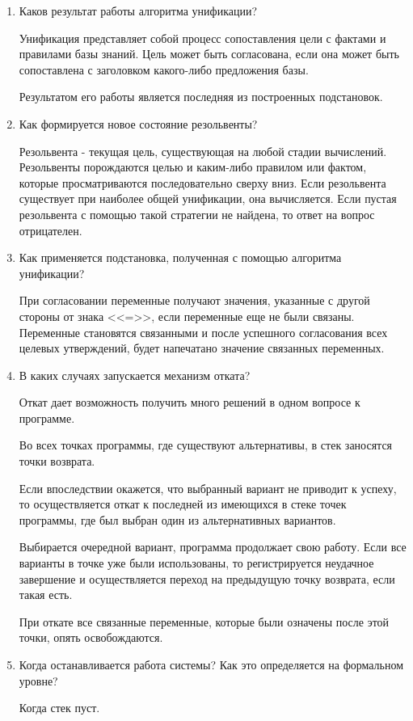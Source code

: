 \documentclass[a4paper,14pt]{extreport} %
\begin{document}
\begin{enumerate}
\item Каков результат работы алгоритма унификации?

Унификация представляет собой процесс сопоставления цели с фактами и правилами базы знаний. Цель может быть согласована, если она может быть сопоставлена с заголовком какого-либо предложения базы.

Результатом его работы является последняя из построенных подстановок. 

\item Как формируется новое состояние резольвенты?

Резольвента - текущая цель, существующая на любой стадии вычислений. Резольвенты порождаются целью и каким-либо правилом или фактом, которые просматриваются последовательно сверху вниз. Если резольвента существует при наиболее общей унификации, она вычисляется. Если пустая резольвента с помощью такой стратегии не найдена, то ответ на вопрос отрицателен.

\item Как применяется подстановка, полученная с помощью алгоритма унификации?

При согласовании переменные получают значения, указанные с другой стороны от знака <<=>>, если переменные еще не были связаны. Переменные становятся связанными и после успешного согласования всех целевых утверждений, будет напечатано значение связанных переменных.

\item В каких случаях запускается механизм отката?

Откат дает возможность получить много решений в одном вопросе к программе. 

Во всех точках программы, где существуют альтернативы, в стек заносятся точки возврата. 

Если впоследствии окажется, что выбранный вариант не приводит к успеху, то осуществляется откат к последней из имеющихся в стеке точек программы, где был выбран один из альтернативных вариантов. 

Выбирается очередной вариант, программа продолжает свою работу. Если все варианты в точке уже были использованы, то регистрируется неудачное завершение и осуществляется переход на предыдущую точку возврата, если такая есть. 

При откате все связанные переменные, которые были означены после этой точки, опять освобождаются.

\item Когда останавливается работа системы? Как это определяется на формальном уровне?

Когда стек пуст. 

\end{enumerate}
 
\end{document}
